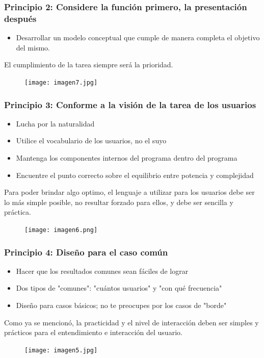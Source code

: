 \documentclass[11pt]{beamer}
\begin{document}
\begin{frame}
\frametitle{Principio 2: Considere la función primero, la presentación después}
    \par
    \justify
    \color{black}
    \begin{itemize}
    \item Desarrollar un modelo conceptual que cumple de manera completa el objetivo del mismo.
    \end{itemize}
    \par
    \vspace{2mm}
    El cumplimiento de la tarea siempre será la prioridad.
    \begin{figure}
    \centering
     \texttt{[image: imagen7.jpg]} 
    \end{figure}
\end{frame}

\begin{frame}
\frametitle{Principio 3: Conforme a la visión de la tarea de los usuarios}
    \par
    \justify
    \color{black}
    \begin{itemize}
    \item Lucha por la naturalidad
    \item Utilice el vocabulario de los usuarios, no el suyo
    \item Mantenga los componentes internos del programa dentro del programa
    \item Encuentre el punto correcto sobre el equilibrio entre potencia y complejidad
    \end{itemize}
    \par
    \vspace{2mm}
    Para poder brindar algo optimo, el lenguaje a utilizar para los usuarios debe ser lo más simple posible, no resultar forzado para ellos, y debe ser sencilla y práctica.
    \begin{figure}
    \centering
     \texttt{[image: imagen6.png]} 
    \end{figure}
\end{frame}

\begin{frame}
\frametitle{Principio 4: Diseño para el caso común}
    \par
    \justify
    \color{black}
    \begin{itemize}
    \item Hacer que los resultados comunes sean fáciles de lograr
    \item Dos tipos de "comunes": "cuántos usuarios" y "con qué frecuencia"
    \item Diseño para casos básicos; no te preocupes por los casos de "borde"
    \end{itemize}
    \par
    \vspace{2mm}
    Como ya se mencionó, la practicidad y el nivel de interacción deben ser simples y prácticos para el entendimiento e interacción del usuario.
    \begin{figure}
    \centering
     \texttt{[image: imagen5.jpg]} 
    \end{figure}
\end{frame}
\end{document}
